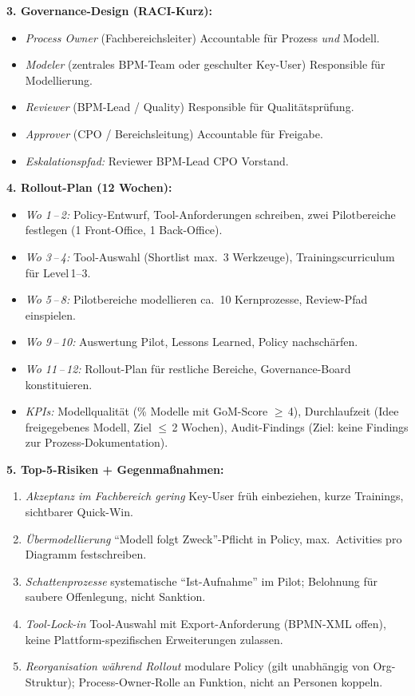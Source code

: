 \documentclass[11pt,a4paper,oneside]{article}
\begin{document}
\begin{loesungbox}
\smallskip
\textbf{3. Governance-Design (RACI-Kurz):}
\begin{itemize}
  \item \emph{Process Owner} (Fachbereichsleiter) \textendash{} Accountable f\"ur Prozess \emph{und} Modell.
  \item \emph{Modeler} (zentrales BPM-Team oder geschulter Key-User) \textendash{} Responsible f\"ur Modellierung.
  \item \emph{Reviewer} (BPM-Lead / Quality) \textendash{} Responsible f\"ur Qualit\"atspr\"ufung.
  \item \emph{Approver} (CPO / Bereichsleitung) \textendash{} Accountable f\"ur Freigabe.
  \item \emph{Eskalationspfad:} Reviewer \textrightarrow{} BPM-Lead \textrightarrow{} CPO \textrightarrow{} Vorstand.
\end{itemize}

\smallskip
\textbf{4. Rollout-Plan (12 Wochen):}
\begin{itemize}
  \item \emph{Wo 1\,--\,2:} Policy-Entwurf, Tool-Anforderungen schreiben, zwei Pilotbereiche festlegen (1 Front-Office, 1 Back-Office).
  \item \emph{Wo 3\,--\,4:} Tool-Auswahl (Shortlist max.\ 3 Werkzeuge), Trainingscurriculum f\"ur Level\,1--3.
  \item \emph{Wo 5\,--\,8:} Pilotbereiche modellieren ca.\ 10 Kernprozesse, Review-Pfad einspielen.
  \item \emph{Wo 9\,--\,10:} Auswertung Pilot, Lessons Learned, Policy nachsch\"arfen.
  \item \emph{Wo 11\,--\,12:} Rollout-Plan f\"ur restliche Bereiche, Governance-Board konstituieren.
  \item \emph{KPIs:} Modellqualit\"at (\% Modelle mit GoM-Score $\geq$\,4), Durchlaufzeit (Idee\,\textrightarrow{}\,freigegebenes Modell, Ziel $\leq$\,2 Wochen), Audit-Findings (Ziel: keine Findings zur Prozess-Dokumentation).
\end{itemize}

\smallskip
\textbf{5. Top-5-Risiken + Gegenma{\ss}nahmen:}
\begin{enumerate}
  \item \emph{Akzeptanz im Fachbereich gering} \textrightarrow{} Key-User fr\"uh einbeziehen, kurze Trainings, sichtbarer Quick-Win.
  \item \emph{\"Ubermodellierung} \textrightarrow{} ``Modell folgt Zweck''-Pflicht in Policy, max.\ Activities pro Diagramm festschreiben.
  \item \emph{Schattenprozesse} \textrightarrow{} systematische ``Ist-Aufnahme'' im Pilot; Belohnung f\"ur saubere Offen\-legung, nicht Sanktion.
  \item \emph{Tool-Lock-in} \textrightarrow{} Tool-Auswahl mit Export-Anforderung (BPMN-XML offen), keine Plattform-spezifischen Erweiterungen zulassen.
  \item \emph{Reorganisation w\"ahrend Rollout} \textrightarrow{} modulare Policy (gilt unabh\"angig von Org-Struktur); Process-Owner-Rolle an Funktion, nicht an Personen koppeln.
\end{enumerate}


\end{loesungbox}
\end{document}
